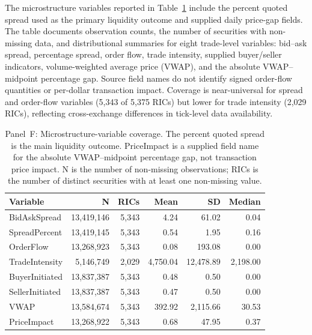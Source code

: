 \documentclass{article}
\theoremstyle{plain}
\begin{document}
The microstructure variables reported in Table~\ref{tab:panel_f} include the percent quoted spread used as the primary liquidity outcome and supplied daily price-gap fields. The table documents observation counts, the number of securities with non-missing data, and distributional summaries for eight trade-level variables: bid--ask spread, percentage spread, order flow, trade intensity, supplied buyer/seller indicators, volume-weighted average price (VWAP), and the absolute VWAP--midpoint percentage gap. Source field names do not identify signed order-flow quantities or per-dollar transaction impact. Coverage is near-universal for spread and order-flow variables (5,343 of 5,375 RICs) but lower for trade intensity (2,029 RICs), reflecting cross-exchange differences in tick-level data availability.

\begin{table}[!ht]
\centering
\footnotesize
\begin{tabular}{l r r r r r}
\toprule
\textbf{Variable} & \textbf{N} & \textbf{RICs} & \textbf{Mean} & \textbf{SD} & \textbf{Median} \\
\midrule
  BidAskSpread & 13,419,146 & 5,343 & 4.24 & 61.02 & 0.04 \\
  SpreadPercent & 13,419,145 & 5,343 & 0.54 & 1.95 & 0.16 \\
  OrderFlow & 13,268,923 & 5,343 & 0.08 & 193.08 & 0.00 \\
  TradeIntensity & 5,146,749 & 2,029 & 4,750.04 & 12,478.89 & 2,198.00 \\
  BuyerInitiated & 13,837,387 & 5,343 & 0.48 & 0.50 & 0.00 \\
  SellerInitiated & 13,837,387 & 5,343 & 0.47 & 0.50 & 0.00 \\
  VWAP & 13,584,674 & 5,343 & 392.92 & 2,115.66 & 30.53 \\
  PriceImpact & 13,268,922 & 5,343 & 0.68 & 47.95 & 0.37 \\
\bottomrule
\end{tabular}
\caption{Panel~F: Microstructure-variable coverage. The percent quoted spread is the main liquidity outcome. PriceImpact is a supplied field name for the absolute VWAP--midpoint percentage gap, not transaction price impact. N is the number of non-missing observations; RICs is the number of distinct securities with at least one non-missing value.}
\label{tab:panel_f}
\end{table}
\end{document}
